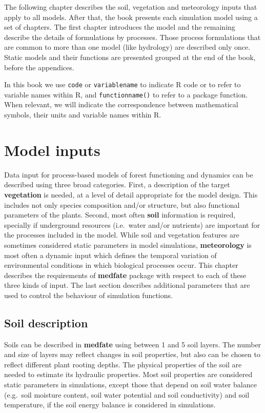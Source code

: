 \documentclass[]{book}
\begin{document}
The following chapter describes the soil, vegetation and meteorology
inputs that apply to all models. After that, the book presents each
simulation model using a set of chapters. The first chapter introduces
the model and the remaining describe the details of formulations by
processes. Those process formulations that are common to more than one
model (like hydrology) are described only once. Static models and their
functions are presented grouped at the end of the book, before the
appendices.

In this book we use \texttt{code} or \texttt{variablename} to indicate R
code or to refer to variable names within R, and \texttt{functionname()}
to refer to a package function. When relevant, we will indicate the
correspondence between mathematical symbols, their units and variable
names within R.

\chapter{Model inputs}\label{model-inputs}

Data input for process-based models of forest functioning and dynamics
can be described using three broad categories. First, a description of
the target \textbf{vegetation} is needed, at a level of detail
appropriate for the model design. This includes not only species
composition and/or structure, but also functional parameters of the
plants. Second, most often \textbf{soil} information is required,
specially if underground resources (i.e.~water and/or nutrients) are
important for the processes included in the model. While soil and
vegetation features are sometimes considered static parameters in model
simulations, \textbf{meteorology} is most often a dynamic input which
defines the temporal variation of environmental conditions in which
biological processes occur. This chapter describes the requirements of
\textbf{medfate} package with respect to each of these three kinds of
input. The last section describes additional parameters that are used to
control the behaviour of simulation functions.

\section{Soil description}\label{soil-description}

Soils can be described in \textbf{medfate} using between 1 and 5 soil
layers. The number and size of layers may reflect changes in soil
properties, but also can be chosen to reflect different plant rooting
depths. The physical properties of the soil are needed to estimate its
hydraulic properties. Most soil properties are considered static
parameters in simulations, except those that depend on soil water
balance (e.g.~soil moisture content, soil water potential and soil
conductivity) and soil temperature, if the soil energy balance is
considered in simulations.
\end{document}
